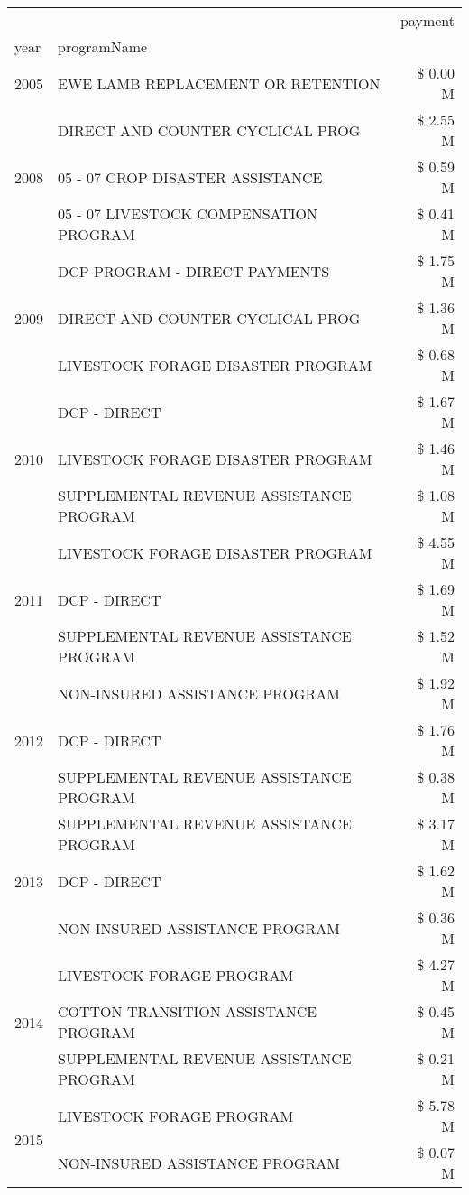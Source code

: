 \begin{tabular}{llr}
\toprule
 &  & payment \\
year & programName &  \\
\midrule
2005 & EWE LAMB REPLACEMENT OR RETENTION & \$ 0.00 M \\
\cline{1-3}
\multirow[t]{3}{*}{2008} & DIRECT AND COUNTER CYCLICAL PROG & \$ 2.55 M \\
 & 05 - 07 CROP DISASTER ASSISTANCE & \$ 0.59 M \\
 & 05 - 07 LIVESTOCK COMPENSATION PROGRAM & \$ 0.41 M \\
\cline{1-3}
\multirow[t]{3}{*}{2009} & DCP PROGRAM - DIRECT PAYMENTS & \$ 1.75 M \\
 & DIRECT AND COUNTER CYCLICAL PROG & \$ 1.36 M \\
 & LIVESTOCK FORAGE DISASTER  PROGRAM & \$ 0.68 M \\
\cline{1-3}
\multirow[t]{3}{*}{2010} & DCP - DIRECT & \$ 1.67 M \\
 & LIVESTOCK FORAGE DISASTER PROGRAM & \$ 1.46 M \\
 & SUPPLEMENTAL REVENUE ASSISTANCE PROGRAM & \$ 1.08 M \\
\cline{1-3}
\multirow[t]{3}{*}{2011} & LIVESTOCK FORAGE DISASTER PROGRAM & \$ 4.55 M \\
 & DCP - DIRECT & \$ 1.69 M \\
 & SUPPLEMENTAL REVENUE ASSISTANCE PROGRAM & \$ 1.52 M \\
\cline{1-3}
\multirow[t]{3}{*}{2012} & NON-INSURED ASSISTANCE PROGRAM & \$ 1.92 M \\
 & DCP - DIRECT & \$ 1.76 M \\
 & SUPPLEMENTAL REVENUE ASSISTANCE PROGRAM & \$ 0.38 M \\
\cline{1-3}
\multirow[t]{3}{*}{2013} & SUPPLEMENTAL REVENUE ASSISTANCE PROGRAM & \$ 3.17 M \\
 & DCP - DIRECT & \$ 1.62 M \\
 & NON-INSURED ASSISTANCE PROGRAM & \$ 0.36 M \\
\cline{1-3}
\multirow[t]{3}{*}{2014} & LIVESTOCK FORAGE PROGRAM & \$ 4.27 M \\
 & COTTON TRANSITION ASSISTANCE PROGRAM & \$ 0.45 M \\
 & SUPPLEMENTAL REVENUE ASSISTANCE PROGRAM & \$ 0.21 M \\
\cline{1-3}
\multirow[t]{3}{*}{2015} & LIVESTOCK FORAGE PROGRAM & \$ 5.78 M \\
 & NON-INSURED ASSISTANCE PROGRAM & \$ 0.07 M \\

\end{tabular}
